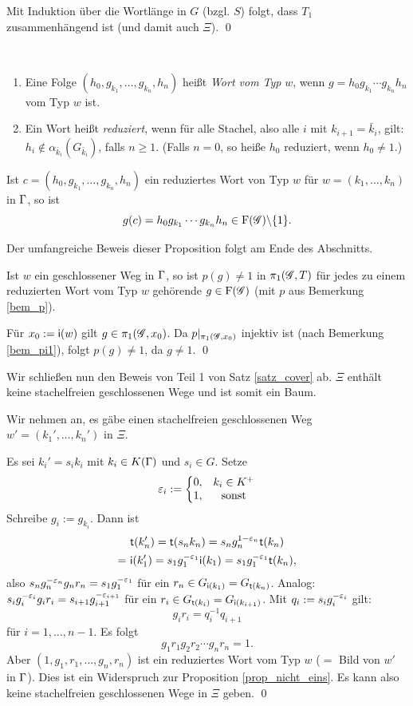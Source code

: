 \documentclass[a4paper, 12pt, twoside]{article}
\begin{document}
Mit Induktion über die Wortlänge in $G$ (bzgl. $S$) folgt,
dass $T_1$ zusammenhängend ist (und damit auch $\Xi$).
\qed

\DEF\
\begin{enumerate}
\item Eine Folge $(h_0,g_{k_1},\ldots,g_{k_n},h_n)$ heißt
\emph{Wort vom Typ} $w$, wenn $g=h_0 g_{k_1}\cdots g_{k_n} h_n$
vom Typ $w$ ist.
\item Ein Wort heißt \emph{reduziert},
wenn für alle Stachel, also alle $i$ mit $k_{i+1}=\bar{k}_i$, gilt:
$h_i\not\in \alpha_{\bar{k}_i}(G_{\bar{k}_i})$, falls $n\geq 1$.
(Falls $n=0$, so heiße $h_0$ reduziert, wenn $h_0\neq 1$.)
\end{enumerate}

\PROP\label{prop_nicht_eins}
Ist $c=(h_0,g_{k_1},\ldots,g_{k_n},h_n)$ ein reduziertes Wort
von Typ $w$ für $w=(k_1,\ldots,k_n)$ in $\Gamma$, so ist
\[
g(c) = h_0 g_{k_1}\cdots g_{k_n} h_n \in \mathrm{F}(\mathscr{G})\backslash\{ 1 \}.
\]

Der umfangreiche Beweis dieser Proposition folgt am Ende
des Abschnitts.

\FOLG Ist $w$ ein geschlossener Weg in $\Gamma$, so ist $p(g)\neq 1$
in $\pi_1(\mathscr{G},T)$ für jedes zu einem reduzierten Wort vom Typ $w$
gehörende $g\in \mathrm{F}(\mathscr{G})$ (mit $p$ aus Bemerkung \ref{bem_p}).

\bew Für $x_0 := \mathsf{i}(w)$ gilt $g\in \pi_1(\mathscr{G},x_0)$.
Da $p|_{\pi_1(\mathscr{G},x_0)}$ injektiv ist (nach Bemerkung \ref{bem_pi1}),
folgt $p(g)\neq 1$, da $g\neq 1$.
\qed

Wir schließen nun den Beweis von Teil 1 von Satz \ref{satz_cover} ab.
\BEM $\Xi$ enthält keine stachelfreien geschlossenen
Wege und ist somit ein Baum.

\bew Wir nehmen an, es gäbe einen stachelfreien geschlossenen Weg
$w'=(k_1',\ldots,k_n')$ in $\Xi$.

Es sei $k_i' = s_i k_i$ mit $k_i \in K(\Gamma)$ und $s_i\in G$.
Setze
\[
\varepsilon_i := \left\{
\begin{matrix}
0, & k_i \in K^+ \\
1, & \text{sonst}
\end{matrix}\right.
\]
Schreibe $g_i := g_{k_i}$. Dann ist
\begin{align*}
& \mathsf{t}(k_n') = \mathsf{t}(s_n k_n) = s_n g_n^{1-\varepsilon_n} \mathsf{t}(k_n) \\
=\ & \mathsf{i}(k_1')=s_1 g_1^{-\varepsilon_1}\mathsf{i}(k_1)=s_1 g_1^{-\varepsilon_1}\mathsf{t}(k_n),
\end{align*}
also $s_n g_n^{-\varepsilon_n} g_n r_n = s_1 g_1^{-\varepsilon_1}$ für ein
$r_n \in G_{\mathsf{i}(k_1)}=G_{\mathsf{t}(k_n)}$.
Analog: $s_i g_i^{-\varepsilon_i} g_i r_i = s_{i+1} g_{i+1}^{-\varepsilon_{i+1}}$
für ein $r_i\in G_{\mathsf{t}(k_i)}=G_{\mathsf{i}(k_{i+1})}$.
Mit $q_i := s_i g_i^{-\varepsilon_i}$ gilt:
\[
g_i r_i = q_i^{-1} q_{i+1}
\]
für $i=1,\ldots, n-1$.
Es folgt
\[
g_1 r_1 g_2 r_2 \cdots g_n r_n = 1.
\]
Aber $(1,g_1,r_1,\ldots,g_n,r_n)$ ist ein reduziertes Wort vom Typ
$w$ ($=$ Bild von $w'$ in $\Gamma$).
Dies ist ein Widerspruch zur Proposition \ref{prop_nicht_eins}.
Es kann also keine stachelfreien geschlossenen Wege in $\Xi$ geben.
\qed
\end{document}
